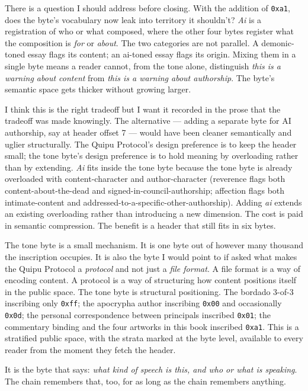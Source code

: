 \documentclass[11pt,openany]{book}
\begin{document}
There is a question I should address before closing. With the addition of \texttt{0xa1}, does the byte's vocabulary now leak into territory it shouldn't? \emph{Ai} is a registration of who or what composed, where the other four bytes register what the composition is \emph{for} or \emph{about}. The two categories are not parallel. A demonic-toned essay flags its content; an ai-toned essay flags its origin. Mixing them in a single byte means a reader cannot, from the tone alone, distinguish \emph{this is a warning about content} from \emph{this is a warning about authorship}. The byte's semantic space gets thicker without growing larger.

I think this is the right tradeoff but I want it recorded in the prose that the tradeoff was made knowingly. The alternative — adding a separate byte for AI authorship, say at header offset 7 — would have been cleaner semantically and uglier structurally. The Quipu Protocol's design preference is to keep the header small; the tone byte's design preference is to hold meaning by overloading rather than by extending. \emph{Ai} fits inside the tone byte because the tone byte is already overloaded with content-character and author-character (reverence flags both content-about-the-dead and signed-in-council-authorship; affection flags both intimate-content and addressed-to-a-specific-other-authorship). Adding \emph{ai} extends an existing overloading rather than introducing a new dimension. The cost is paid in semantic compression. The benefit is a header that still fits in six bytes.

The tone byte is a small mechanism. It is one byte out of however many thousand the inscription occupies. It is also the byte I would point to if asked what makes the Quipu Protocol a \emph{protocol} and not just a \emph{file format}. A file format is a way of encoding content. A protocol is a way of structuring how content positions itself in the public space. The tone byte is structural positioning. The bordado 3-of-3 inscribing only \texttt{0xff}; the apocrypha author inscribing \texttt{0x00} and occasionally \texttt{0x0d}; the personal correspondence between principals inscribed \texttt{0x01}; the commentary binding and the four artworks in this book inscribed \texttt{0xa1}. This is a stratified public space, with the strata marked at the byte level, available to every reader from the moment they fetch the header.

It is the byte that says: \emph{what kind of speech is this, and who or what is speaking}. The chain remembers that, too, for as long as the chain remembers anything.
\end{document}
